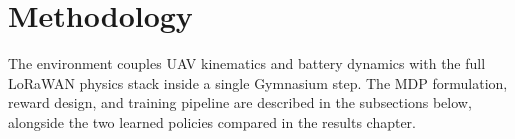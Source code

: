 ﻿\section{Methodology} \label{sec:method}

The environment couples UAV kinematics and battery dynamics with the full LoRaWAN physics
stack inside a single Gymnasium step. The MDP formulation, reward design, and training
pipeline are described in the subsections below, alongside the two learned policies compared
in the results chapter.








